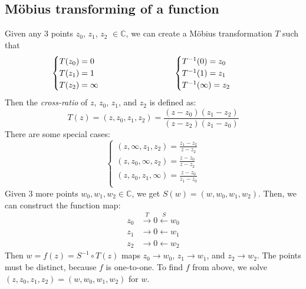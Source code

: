 \documentclass[11pt]{article}
\begin{document}
\subsection{Möbius transforming of a function}
Given any 3 points $z_0$, $z_1$, $z_2$ $\in \mathbb{C}$, we can create a Möbius transformation $T$ such that  
\begin{alignat*}{2}
    & \begin{aligned} & \begin{cases}
  T(z_0) = 0\\
  T(z_1) = 1\\
  T(z_2) = \infty 
  \end{cases}
  \MoveEqLeft[-1]\text{}
  \end{aligned}
    & \hskip 6em &
  \begin{aligned} & \begin{cases}
  T^{-1}(0) = z_0\\
  T^{-1}(1) = z_1\\
  T^{-1}(\infty) = z_2
  \end{cases} 
  \MoveEqLeft[-1]\text{}
  \end{aligned}
\end{alignat*}
Then the \textit{cross-ratio} of $z$, $z_0$, $z_1$, and $z_2$ is defined as: 
$$T(z) = (z, z_0, z_1, z_2) = \frac{(z -z_0)(z_1 - z_2)}{(z - z_2)(z_1 - z_0)}$$
There are some special cases: 
$$
\begin{cases} 
	(z, \infty, z_1, z_2) = \frac{z_1 - z_2}{z - z_2} \\
	(z, z_0, \infty, z_2) = \frac{z - z_0}{z - z_2} \\
	(z, z_0, z_1, \infty) = \frac{z - z_0}{z_1 - z_0}\\
\end{cases}
$$
Given 3 more points $w_0, w_1, w_2 \in \mathbb{C}$, we get $S(w) = (w, w_0, w_1, w_2)$. Then, we can construct the function map: 
\begin{align*}
z_0 &\overset{T}{\longrightarrow} 0 \overset{S}{\longleftarrow} w_0 \\
z_1 &\longrightarrow 0 \longleftarrow w_1\\
z_2 &\longrightarrow 0 \longleftarrow w_2
\end{align*}
Then $w = f(z) = S^{-1} \circ T(z)$ maps $z_0 \to w_0$, $z_1 \to w_1$, and $z_2 \to w_2$. The points must be distinct, because $f$ is one-to-one. To find $f$ from above, we solve $(z, z_0, z_1, z_2) = (w, w_0, w_1, w_2)$ for $w$. \\
\newline
\end{document}
